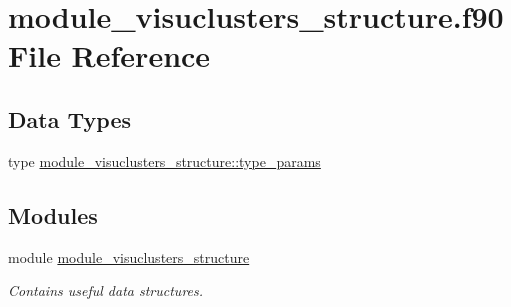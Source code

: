 \hypertarget{module__visuclusters__structure_8f90}{}\section{module\+\_\+visuclusters\+\_\+structure.\+f90 File Reference}
\label{module__visuclusters__structure_8f90}
\subsection*{Data Types}
\begin{DoxyCompactItemize}
\item 
type \hyperlink{structmodule__visuclusters__structure_1_1type__params}{module\+\_\+visuclusters\+\_\+structure\+::type\+\_\+params}
\end{DoxyCompactItemize}
\subsection*{Modules}
\begin{DoxyCompactItemize}
\item 
module \hyperlink{namespacemodule__visuclusters__structure}{module\+\_\+visuclusters\+\_\+structure}
\begin{DoxyCompactList}\small\item\em Contains useful data structures. \end{DoxyCompactList}\end{DoxyCompactItemize}
